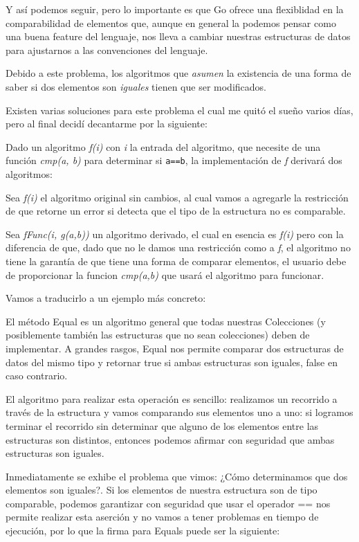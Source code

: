 \documentclass[11pt]{article}
\begin{document}
Y así podemos seguir, pero lo importante es que Go ofrece una flexiblidad en la comparabilidad de elementos que, aunque en general la podemos pensar como una buena feature del lenguaje, nos lleva a cambiar nuestras estructuras de datos para ajustarnos a las convenciones del lenguaje.

Debido a este problema, los algoritmos que \emph{asumen} la existencia de una forma de saber si dos elementos son \emph{iguales} tienen que ser modificados.

Existen varias soluciones para este problema el cual me quitó el sueño varios días, pero al final decidí decantarme por la siguiente:

Dado un algoritmo \emph{f(i)} con \emph{i} la entrada del algoritmo, que necesite de una función \emph{cmp(a, b)} para determinar si \texttt{a==b}, la implementación de \emph{f} derivará dos algoritmos:

Sea \emph{f(i)} el algoritmo original sin cambios, al cual vamos a agregarle la restricción de que retorne un error si detecta que el tipo de la estructura no es comparable.

Sea \emph{fFunc(i, g(a,b))} un algoritmo derivado, el cual en esencia es \emph{f(i)} pero con la diferencia de que, dado que no le damos una restricción como a \emph{f}, el algoritmo no tiene la garantía de que tiene una forma de comparar elementos, el usuario debe de proporcionar la funcion \emph{cmp(a,b)} que usará el algoritmo para funcionar.

Vamos a traducirlo a un ejemplo más concreto:

El método Equal es un algoritmo general que todas nuestras Colecciones (y posiblemente también las estructuras que no sean colecciones) deben de implementar. A grandes rasgos, Equal nos permite comparar dos estructuras de datos del mismo tipo y retornar true si ambas estructuras son iguales, false en caso contrario.

El algoritmo para realizar esta operación es sencillo: realizamos un recorrido a través de la estructura y vamos comparando sus elementos uno a uno: si logramos terminar el recorrido sin determinar que alguno de los elementos entre las estructuras son distintos, entonces podemos afirmar con seguridad que ambas estructuras son iguales.

Inmediatamente se exhibe el problema que vimos: ¿Cómo determinamos que dos elementos son iguales?. Si los elementos de nuestra estructura son de tipo comparable, podemos garantizar con seguridad que usar el operador == nos permite realizar esta aserción y no vamos a tener problemas en tiempo de ejecución, por lo que la firma para Equals puede ser la siguiente:
\end{document}
